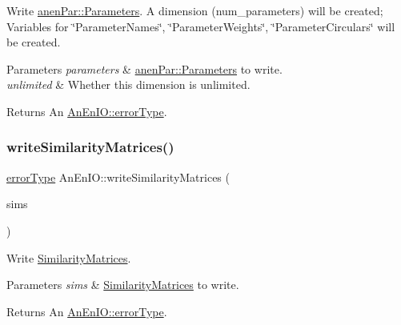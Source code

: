 Write \mbox{\hyperlink{classanen_par_1_1_parameters}{anen\+Par\+::\+Parameters}}. A dimension (num\+\_\+parameters) will be created; Variables for \char`\"{}\+Parameter\+Names\char`\"{}, \char`\"{}\+Parameter\+Weights\char`\"{}, \char`\"{}\+Parameter\+Circulars\char`\"{} will be created. 
\begin{DoxyParams}{Parameters}
{\em parameters} & \mbox{\hyperlink{classanen_par_1_1_parameters}{anen\+Par\+::\+Parameters}} to write. \\
\hline
{\em unlimited} & Whether this dimension is unlimited. \\
\hline
\end{DoxyParams}
\begin{DoxyReturn}{Returns}
An \mbox{\hyperlink{class_an_en_i_o_aa56bc1ec6610b86db4349bce20f9ead0}{An\+En\+I\+O\+::error\+Type}}. 
\end{DoxyReturn}
\mbox{\label{class_an_en_i_o_af4d66adaa8c94540dd6e7dd21c41be38}} 
\subsubsection{\texorpdfstring{write\+Similarity\+Matrices()}{writeSimilarityMatrices()}}
{\footnotesize\ttfamily \mbox{\hyperlink{class_an_en_i_o_aa56bc1ec6610b86db4349bce20f9ead0}{error\+Type}} An\+En\+I\+O\+::write\+Similarity\+Matrices (\begin{DoxyParamCaption}\item[{const \mbox{\hyperlink{class_similarity_matrices}{Similarity\+Matrices}} \&}]{sims }\end{DoxyParamCaption})}

Write \mbox{\hyperlink{class_similarity_matrices}{Similarity\+Matrices}}.


\begin{DoxyParams}{Parameters}
{\em sims} & \mbox{\hyperlink{class_similarity_matrices}{Similarity\+Matrices}} to write. \\
\hline
\end{DoxyParams}
\begin{DoxyReturn}{Returns}
An \mbox{\hyperlink{class_an_en_i_o_aa56bc1ec6610b86db4349bce20f9ead0}{An\+En\+I\+O\+::error\+Type}}. 
\end{DoxyReturn}
\mbox{\label{class_an_en_i_o_ac4cb6e66c0661eff0a10dcc3cb3324e8}} 
